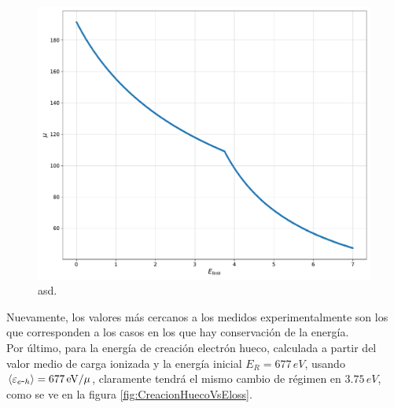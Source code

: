 \begin{figure}%
    \centering
    \includegraphics[scale=0.35]{Figs/ELoss_vs_mu_5ktrials_0-7Eloss.pdf}
    \caption{\footnotesize{asd.}}
    \label{fig:ElossVsMu}
\end{figure}
Nuevamente, los valores más cercanos a los medidos experimentalmente son los que corresponden a los casos en los que hay conservación de la energía.\\
\indent Por último, para la energía de creación electrón hueco, calculada a partir del valor medio de carga ionizada y la energía inicial $E_{R} = 677\,\si{eV}$, usando $\left\langle\varepsilon_{\eh} \right\rangle= 677\,\si{eV}/\mu$, claramente tendrá el mismo cambio de régimen en $3.75\,\si{eV}$, como se ve en la figura \ref{fig:CreacionHuecoVsEloss}.
